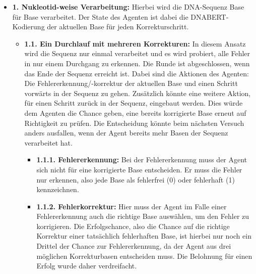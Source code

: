 \documentclass[oneside,bibliography=totocnumbered,BCOR=5mm]{scrbook}%
\theoremstyle{definition}
\theoremstyle{definition}
\theoremstyle{definition}
\theoremstyle{definition}
\theoremstyle{definition}
\theoremstyle{definition}
\begin{document}
\begin{itemize}

  \item \textbf{1. Nukleotid-weise Verarbeitung:} Hierbei wird die DNA-Sequenz Base für Base verarbeitet. Der State des Agenten ist dabei die DNABERT-Kodierung
  der aktuellen Base für jeden Korrekturschritt. 

  \begin{itemize}

    \item \textbf{1.1. Ein Durchlauf mit mehreren Korrekturen:} In diesem Ansatz wird die Sequenz nur einmal verarbeitet und es wird probiert, alle Fehler 
    in nur einem Durchgang zu erkennen. Die Runde ist abgeschlossen, wenn das Ende der Sequenz erreicht ist.
    Dabei sind die Aktionen des Agenten: Die Fehlererkennung/-korrektur der aktuellen Base und einen Schritt vorwärts in der Sequenz zu gehen.
    Zusätzlich könnte eine weitere Aktion, für einen Schritt zurück in der Sequenz, eingebaut werden. Dies würde dem Agenten die Chance geben,
    eine bereits korrigierte Base erneut auf Richtigkeit zu prüfen. Die Entscheidung könnte beim nächsten Versuch anders ausfallen, 
    wenn der Agent bereits mehr Basen der Sequenz verarbeitet hat.

    \begin{itemize}

      \item \textbf{1.1.1. Fehlererkennung:} Bei der Fehlererkennung muss der Agent sich nicht für eine korrigierte Base entscheiden. Er muss die Fehler 
      nur erkennen, also jede Base als fehlerfrei (0) oder fehlerhaft (1) kennzeichnen.

      \item \textbf{1.1.2. Fehlerkorrektur:} Hier muss der Agent im Falle einer Fehlererkennung auch die richtige Base auswählen, um den Fehler zu korrigieren.
      Die Erfolgschance, also die Chance auf die richtige Korrektur einer tatsächlich fehlerhaften Base, ist hierbei nur noch ein Drittel
      der Chance zur Fehlererkennung, da der Agent aus drei möglichen Korrekturbasen entscheiden muss. Die Belohnung für einen Erfolg
      wurde daher verdreifacht.


\end{itemize}
\end{itemize}
\end{itemize}
\end{document}
